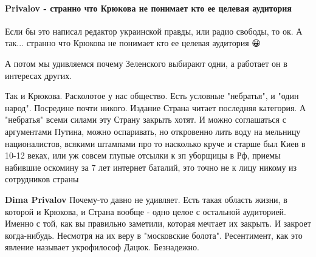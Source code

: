  
 
 
 
 
\paragraph{Privalov - странно что Крюкова не понимает кто ее целевая аудитория}

\begin{itemize}
 
Если бы это написал редактор украинской правды, или радио свободы, то ок. А
так... странно что Крюкова не понимает кто ее целевая аудитория 😀

А потом мы удивляемся почему Зеленского выбирают одни, а работает он в
интересах других.

Так и Крюкова. Расколотое у нас общество. Есть условные "небратья", и "один
народ". Посредине почти никого. Издание Страна читает последняя категория. А
"небратья" всеми силами эту Страну закрыть хотят. И можно соглашаться с
аргументами Путина, можно оспаривать, но откровенно лить воду на мельницу
националистов, всякими штампами про то насколько круче и старше был Киев в
10-12 веках, или уж совсем глупые отсылки к зп уборщицы в Рф, приемы набившие
оскомину за 7 лет интернет баталий, это точно не к лицу никому из сотрудников
страны

\begin{itemize}
 
\textbf{Dima Privalov} Почему-то давно не удивляет. Есть такая область жизни, в которой и Крюкова, и Страна вообще - одно целое с остальной аудиторией. Именно с той, как вы правильно заметили, которая мечтает их закрыть. И закроет когда-нибудь. Несмотря на их веру в "московские болота". Ресентимент, как это явление называет укрофилософ Дацюк. Безнадежно.


\end{itemize}
\end{itemize}
